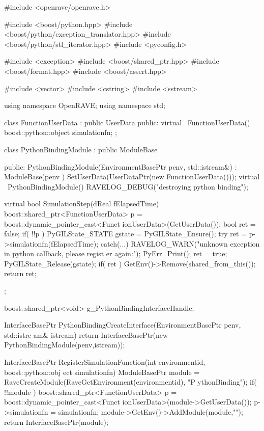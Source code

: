 \begin{DoxyCodeInclude}

#include <openrave/openrave.h>

#include <boost/python.hpp>
#include <boost/python/exception_translator.hpp>
#include <boost/python/stl_iterator.hpp>
#include <pyconfig.h>

#include <exception>
#include <boost/shared_ptr.hpp>
#include <boost/format.hpp>
#include <boost/assert.hpp>

#include <vector>
#include <cstring>
#include <sstream>

using namespace OpenRAVE;
using namespace std;

class FunctionUserData : public UserData
{
public:
    virtual ~FunctionUserData() {
    }
    boost::python::object simulationfn;
};

class PythonBindingModule : public ModuleBase
{
public:
    PythonBindingModule(EnvironmentBasePtr penv, std::istream&) : ModuleBase(penv
      ) {
        SetUserData(UserDataPtr(new FunctionUserData()));
    }
    virtual ~PythonBindingModule() {
        RAVELOG_DEBUG("destroying python binding\n");
    }

    virtual bool SimulationStep(dReal fElapsedTime) {
        boost::shared_ptr<FunctionUserData> p = boost::dynamic_pointer_cast<Funct
      ionUserData>(GetUserData());
        bool ret = false;
        if( !!p ) {
            PyGILState_STATE gstate = PyGILState_Ensure();
            try {
                ret = p->simulationfn(fElapsedTime);
            }
            catch(...) {
                RAVELOG_WARN("unknown exception in python callback, please regist
      er again:\n");
                PyErr_Print();
                ret = true;
            }
            PyGILState_Release(gstate);
            if( ret ) {
                GetEnv()->Remove(shared_from_this());
            }
        }
        return ret;
    }
};

boost::shared_ptr<void> g_PythonBindingInterfaceHandle;

InterfaceBasePtr PythonBindingCreateInterface(EnvironmentBasePtr penv, std::istre
      am& istream)
{
    return InterfaceBasePtr(new PythonBindingModule(penv,istream));
}

InterfaceBasePtr RegisterSimulationFunction(int environmentid, boost::python::obj
      ect simulationfn)
{
    ModuleBasePtr module = RaveCreateModule(RaveGetEnvironment(environmentid), "P
      ythonBinding");
    if( !!module ) {
        boost::shared_ptr<FunctionUserData> p = boost::dynamic_pointer_cast<Funct
      ionUserData>(module->GetUserData());
        p->simulationfn = simulationfn;
        module->GetEnv()->AddModule(module,"");
    }
    return InterfaceBasePtr(module);
}


\end{DoxyCodeInclude}
